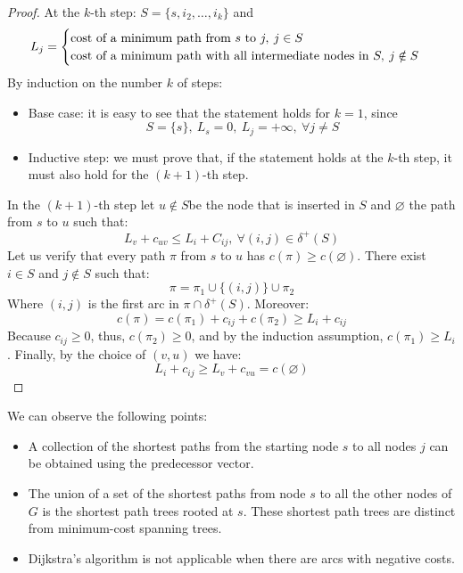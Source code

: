 \documentclass[12pt, a4paper]{report}
\begin{document}
    \begin{proof}
        At the $k$-th step: $S = \{s,i_2,\dots,i_k\}$ and 
        \[L_j=
        \begin{cases}
            \textnormal{cost of a minimum path from } s \textnormal{ to } j,\:j \in S \\ 
            \textnormal{cost of a minimum path with all intermediate nodes in } S, \: j \notin S
        \end{cases}
        \]
        By induction on the number $k$ of steps: 
        \begin{itemize}
            \item Base case: it is easy to see that the statement holds for $k = 1$, since 
                \[S=\{s\},\: L_s=0,\: L_j= +\infty,\: \forall j \neq S \]
            \item Inductive step: we must prove that, if the statement holds at the $k$-th step, it must also hold for the $(k + 1)$-th step. 
        \end{itemize}
        In the $(k + 1)$-th step let $u \notin S$be the node that is inserted in $S$ and $\varnothing$ the path from $s$ to $u$ such that:
        \[L_v + c_{uv} \leq L_i + C_{ij},\: \forall(i,j) \in \delta^{+}(S)\]
        Let us verify that every path $\pi$ from $s$ to $u$ has $c(\pi) \geq c(\varnothing)$. There exist $i \in S$ and $j \notin S$ such that: 
        \[\pi= \pi_1 \cup \{(i,j)\} \cup \pi_2\]
        Where $(i, j)$ is the first arc in $\pi \cap \delta^{+}(S)$. Moreover: 
        \[c(\pi) = c(\pi_1) + c_{ij} + c(\pi_2) \geq L_i + c_{ij}\]
        Because $c_{ij} \geq 0$, thus, $c(\pi_2) \geq 0$, and by the induction assumption, $c(\pi_1) \geq L_i$. Finally, by the choice of $(v,u)$ we have: 
        \[L_i + c_{ij} \geq L_v + c_{vu} = c(\varnothing)\]
    \end{proof}
    We can observe the following points:
    \begin{itemize}
        \item A collection of the shortest paths from the starting node $s$ to all nodes $j$ can be obtained using the predecessor vector.
        \item The union of a set of the shortest paths from node $s$ to all the other nodes of $G$ is the shortest path trees rooted at $s$. 
            These shortest path trees are distinct from minimum-cost spanning trees.
        \item Dijkstra's algorithm is not applicable when there are arcs with negative costs.
    \end{itemize}
\end{document}
